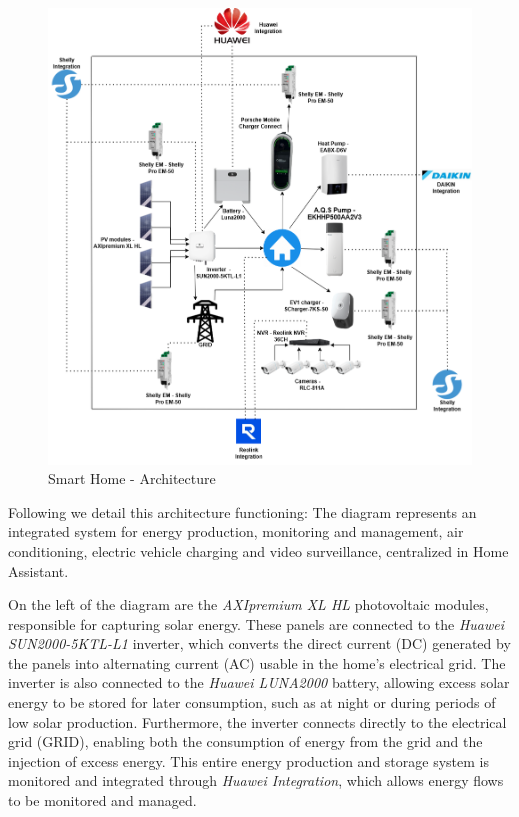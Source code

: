 \documentclass[graybox]{svmult}
\begin{document}
\begin{figure}[ht!] 
	\centering
	\includegraphics[width=\textwidth]{Smart_Home_Architecture.png}
	\caption{Smart Home - Architecture}
	\label{fig:Smart_Home_Architecture.png}
\end{figure}

Following we detail this architecture functioning:  
The diagram represents an integrated system for energy production, monitoring and management, air conditioning, electric vehicle charging and video surveillance, centralized in Home Assistant.

On the left of the diagram are the \textit{AXIpremium XL HL} photovoltaic modules, responsible for capturing solar energy. These panels are connected to the \textit{Huawei SUN2000-5KTL-L1} inverter, which converts the direct current (DC) generated by the panels into alternating current (AC) usable in the home's electrical grid. The inverter is also connected to the \textit{Huawei LUNA2000} battery, allowing excess solar energy to be stored for later consumption, such as at night or during periods of low solar production. Furthermore, the inverter connects directly to the electrical grid (GRID), enabling both the consumption of energy from the grid and the injection of excess energy. This entire energy production and storage system is monitored and integrated through \textit{Huawei Integration}, which allows energy flows to be monitored and managed.
\end{document}
